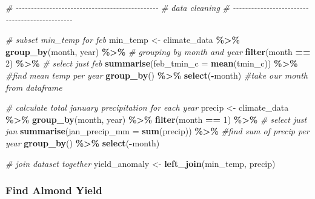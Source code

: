 \documentclass[
]{article}
\newenvironment{Shaded}{\begin{snugshade}}{\end{snugshade}}
\newcommand{\AttributeTok}[1]{\textcolor[rgb]{0.13,0.29,0.53}{#1}}
\newcommand{\CommentTok}[1]{\textcolor[rgb]{0.56,0.35,0.01}{\textit{#1}}}
\newcommand{\DecValTok}[1]{\textcolor[rgb]{0.00,0.00,0.81}{#1}}
\newcommand{\FunctionTok}[1]{\textcolor[rgb]{0.13,0.29,0.53}{\textbf{#1}}}
\newcommand{\NormalTok}[1]{#1}
\newcommand{\OtherTok}[1]{\textcolor[rgb]{0.56,0.35,0.01}{#1}}
\newcommand{\SpecialCharTok}[1]{\textcolor[rgb]{0.81,0.36,0.00}{\textbf{#1}}}
\begin{document}
\begin{Shaded}
\begin{Highlighting}[]
\CommentTok{\# {-}{-}{-}{-}{-}{-}{-}{-}{-}{-}{-}{-}{-}{-}{-}{-}{-}{-}{-}{-}{-}{-}{-}{-}{-}{-}{-}{-}{-}{-}{-}{-}{-}{-}{-}{-}{-}{-}{-}{-}{-}{-}{-}{-}{-}{-}{-}}
\CommentTok{\#                  data cleaning }
\CommentTok{\# {-}{-}{-}{-}{-}{-}{-}{-}{-}{-}{-}{-}{-}{-}{-}{-}{-}{-}{-}{-}{-}{-}{-}{-}{-}{-}{-}{-}{-}{-}{-}{-}{-}{-}{-}{-}{-}{-}{-}{-}{-}{-}{-}{-}{-}{-}{-}}
  
\CommentTok{\# subset min\_temp for feb }
\NormalTok{min\_temp }\OtherTok{\textless{}{-}}\NormalTok{ climate\_data }\SpecialCharTok{\%\textgreater{}\%} 
  \FunctionTok{group\_by}\NormalTok{(month, year) }\SpecialCharTok{\%\textgreater{}\%} \CommentTok{\# grouping by month and year}
  \FunctionTok{filter}\NormalTok{(month }\SpecialCharTok{==} \DecValTok{2}\NormalTok{) }\SpecialCharTok{\%\textgreater{}\%} \CommentTok{\# select just feb}
  \FunctionTok{summarise}\NormalTok{(}\AttributeTok{feb\_tmin\_c =} \FunctionTok{mean}\NormalTok{(tmin\_c)) }\SpecialCharTok{\%\textgreater{}\%} \CommentTok{\#find mean temp per year}
  \FunctionTok{group\_by}\NormalTok{() }\SpecialCharTok{\%\textgreater{}\%} 
  \FunctionTok{select}\NormalTok{(}\SpecialCharTok{{-}}\NormalTok{month) }\CommentTok{\#take our month from dataframe}
  
\CommentTok{\# calculate total january precipitation for each year}
\NormalTok{precip }\OtherTok{\textless{}{-}}\NormalTok{ climate\_data }\SpecialCharTok{\%\textgreater{}\%}
  \FunctionTok{group\_by}\NormalTok{(month, year) }\SpecialCharTok{\%\textgreater{}\%}
  \FunctionTok{filter}\NormalTok{(month }\SpecialCharTok{==} \DecValTok{1}\NormalTok{) }\SpecialCharTok{\%\textgreater{}\%} \CommentTok{\# select just jan}
  \FunctionTok{summarise}\NormalTok{(}\AttributeTok{jan\_precip\_mm =} \FunctionTok{sum}\NormalTok{(precip)) }\SpecialCharTok{\%\textgreater{}\%} \CommentTok{\#find sum of precip per year}
  \FunctionTok{group\_by}\NormalTok{() }\SpecialCharTok{\%\textgreater{}\%} 
  \FunctionTok{select}\NormalTok{(}\SpecialCharTok{{-}}\NormalTok{month)}
  
\CommentTok{\# join dataset together}
\NormalTok{yield\_anomaly }\OtherTok{\textless{}{-}} \FunctionTok{left\_join}\NormalTok{(min\_temp, precip) }
\end{Highlighting}
\end{Shaded}

\hypertarget{find-almond-yield}{%
\subsubsection{Find Almond Yield}\label{find-almond-yield}}
\end{document}
